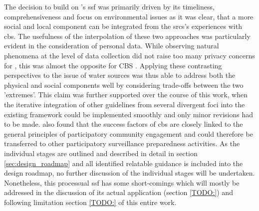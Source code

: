 The decision to build on \autocite{fraislCitizenScienceEnvironmental2022}'s \acrlong{ssf} was primarily driven by its timeliness, comprehensiveness and focus on environmental issues as it was clear, that a more social and local component can be integrated from the \acrshort{srcs}'s experiences with \acrshort{cbs}. The usefulness of the interpolation of these two approaches was particularly evident in the consideration of personal data. While observing natural phenomena at the level of data collection did not raise too many privacy concerns for \autocite{fraislCitizenScienceEnvironmental2022}, this was almost the opposite for CBS \autocite{ifrcCommunityBasedSurveillanceGuiding2017}. Applying these contrasting perspectives to the issue of water sources was thus able to address both the physical and social components well by considering trade-offs between the two 'extremes'. This claim was further supported over the course of this work, when the iterative integration of other guidelines from several divergent foci into the existing framework could be implemented smoothly and only minor revisions had to be made. \autocite{mcgowanCommunitybasedSurveillanceInfectious2022} also found that the success factors of \acrshort{cbs} are closely linked to the general principles of participatory community engagement and could therefore be transferred to other participatory surveillance preparedness activities. As the individual stages are outlined and described in detail in section \ref{sec:design_roadmap} and all identified relatable guidance is included into the design roadmap, no further discussion of the individual stages will be undertaken. %
Nonetheless, this processual \acrshort{ssf} has some short-comings which will mostly be addressed in the discussion of its actual application (section \ref{TODO:}) and following limitation section \ref{TODO:} of this entire work.\newline
